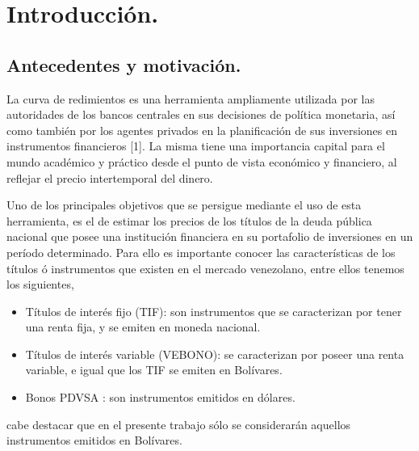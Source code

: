 \chapter{Introducci\'on.}

\section{Antecedentes y motivaci\'on.}

\hspace*{0.4 cm} La curva de redimientos es una herramienta ampliamente utilizada por las autoridades de los bancos centrales en sus decisiones de pol\'itica monetaria, as\'i como tambi\'en por los agentes privados en la planificaci\'on de sus inversiones en instrumentos financieros [1]. La misma tiene una importancia capital
para el mundo acad\'emico y pr\'actico desde el punto de vista econ\'omico y financiero, al reflejar el precio intertemporal del dinero.

\vspace{0.5cm}

\hspace*{0.4 cm} Uno de los principales objetivos que se persigue mediante el uso de esta herramienta, es el de estimar los precios de los t\'itulos de la deuda p\'ublica nacional que posee una instituci\'on financiera en su portafolio de inversiones en un per\'iodo determinado. Para ello es importante conocer las caracter\'isticas de los t\'itulos \'o instrumentos que existen en el mercado venezolano, entre ellos tenemos los siguientes,

\vspace{0.4cm}

\begin{itemize}
  \item T\'itulos de inter\'es fijo (TIF): son instrumentos que se caracterizan por tener una renta fija, y se emiten en moneda nacional.
  \item T\'itulos de inter\'es variable (VEBONO): se caracterizan por poseer una renta variable, e igual que los TIF se emiten en Bol\'ivares.
  \item Bonos PDVSA : son instrumentos emitidos en d\'olares.
\end{itemize}

\vspace{0.5cm}

\noindent cabe destacar que en el presente trabajo s\'olo  se considerar\'an aquellos instrumentos emitidos en Bol\'ivares.

